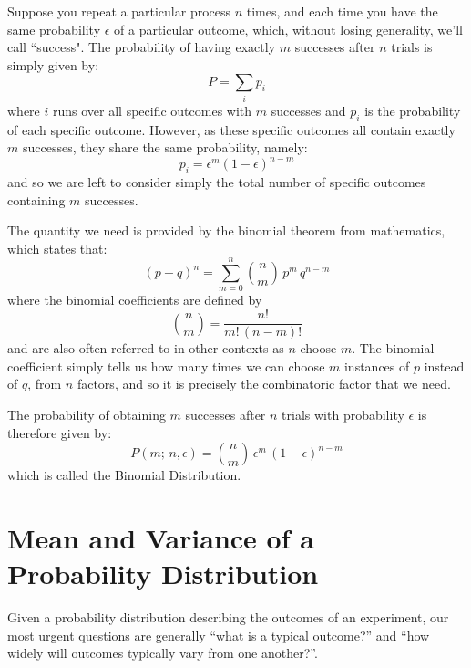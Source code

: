 \documentclass[12pt,oneside]{book}
\begin{document}
Suppose you repeat a particular process $n$ times, and each time you
have the same probability $\epsilon$ of a particular outcome, which,
without losing generality, we'll call ``success".  The probability of
having exactly $m$ successes after $n$ trials is simply given by:
\begin{displaymath}
P = \sum_i p_i
\end{displaymath}
where $i$ runs over all specific outcomes with $m$ successes and $p_i$
is the probability of each specific outcome.  However, as these
specific outcomes all contain exactly $m$ successes, they share the
same probability, namely:
\begin{displaymath}
p_i = \epsilon^m (1 - \epsilon)^{n-m}
\end{displaymath}
and so we are left to consider simply the total number of specific outcomes containing $m$ successes.  

The quantity we need is provided by the binomial theorem from mathematics, which states that:
\begin{equation}
\label{eqn:binomt}
(p+q)^n = \sum_{m=0}^{n} \binom{n}{m} \, p^m \, q^{n-m}
\end{equation}
where the binomial coefficients are defined by
\begin{equation}
\label{eqn:binomc}
\binom{n}{m} = \frac{n!}{m! \, (n-m)!}
\end{equation}
and are also often referred to in other contexts as $n$-choose-$m$.  The binomial coefficient simply tells us how many times we can choose $m$ instances of $p$ instead of $q$, from $n$ factors, and so it is precisely the combinatoric factor that we need.

The probability of obtaining $m$ successes after $n$ trials with probability $\epsilon$ is therefore given by:
\begin{equation}
\label{eqn:binom}
P(m; \, n ,\epsilon) = \binom{n}{m} \, \epsilon^m \, (1 - \epsilon)^{n-m}
\end{equation}
which is called the Binomial Distribution.

\section{Mean and Variance of a Probability Distribution}

Given a probability distribution describing the outcomes of an experiment, our
most urgent questions are generally ``what is a typical outcome?'' and ``how widely will outcomes typically vary from one another?''.
\end{document}
